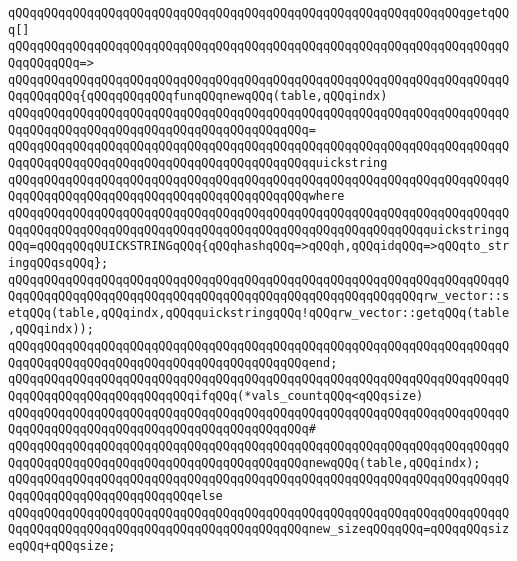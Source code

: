 \verb|qQQqqQQqqQQqqQQqqQQqqQQqqQQqqQQqqQQqqQQqqQQqqQQqqQQqqQQqqQQqqQQqgetqQQq[]|\newline
\verb|qQQqqQQqqQQqqQQqqQQqqQQqqQQqqQQqqQQqqQQqqQQqqQQqqQQqqQQqqQQqqQQqqQQqqQQqqQQqqQQq=>|\newline
\verb|qQQqqQQqqQQqqQQqqQQqqQQqqQQqqQQqqQQqqQQqqQQqqQQqqQQqqQQqqQQqqQQqqQQqqQQqqQQqqQQq{qQQqqQQqqQQqfunqQQqnewqQQq(table,qQQqindx)|\newline
\verb|qQQqqQQqqQQqqQQqqQQqqQQqqQQqqQQqqQQqqQQqqQQqqQQqqQQqqQQqqQQqqQQqqQQqqQQqqQQqqQQqqQQqqQQqqQQqqQQqqQQqqQQqqQQqqQQq=|\newline
\verb|qQQqqQQqqQQqqQQqqQQqqQQqqQQqqQQqqQQqqQQqqQQqqQQqqQQqqQQqqQQqqQQqqQQqqQQqqQQqqQQqqQQqqQQqqQQqqQQqqQQqqQQqqQQqqQQqquickstring|\newline
\verb|qQQqqQQqqQQqqQQqqQQqqQQqqQQqqQQqqQQqqQQqqQQqqQQqqQQqqQQqqQQqqQQqqQQqqQQqqQQqqQQqqQQqqQQqqQQqqQQqqQQqqQQqqQQqqQQqwhere|\newline
\verb|qQQqqQQqqQQqqQQqqQQqqQQqqQQqqQQqqQQqqQQqqQQqqQQqqQQqqQQqqQQqqQQqqQQqqQQqqQQqqQQqqQQqqQQqqQQqqQQqqQQqqQQqqQQqqQQqqQQqqQQqqQQqqQQqquickstringqQQq=qQQqqQQqQUICKSTRINGqQQq{qQQqhashqQQq=>qQQqh,qQQqidqQQq=>qQQqto_stringqQQqsqQQq};|\newline
\newline
\verb|qQQqqQQqqQQqqQQqqQQqqQQqqQQqqQQqqQQqqQQqqQQqqQQqqQQqqQQqqQQqqQQqqQQqqQQqqQQqqQQqqQQqqQQqqQQqqQQqqQQqqQQqqQQqqQQqqQQqqQQqqQQqqQQqrw_vector::setqQQq(table,qQQqindx,qQQqquickstringqQQq!qQQqrw_vector::getqQQq(table,qQQqindx));|\newline
\verb|qQQqqQQqqQQqqQQqqQQqqQQqqQQqqQQqqQQqqQQqqQQqqQQqqQQqqQQqqQQqqQQqqQQqqQQqqQQqqQQqqQQqqQQqqQQqqQQqqQQqqQQqqQQqqQQqend;|\newline
\newline
\verb|qQQqqQQqqQQqqQQqqQQqqQQqqQQqqQQqqQQqqQQqqQQqqQQqqQQqqQQqqQQqqQQqqQQqqQQqqQQqqQQqqQQqqQQqqQQqqQQqifqQQq(*vals_countqQQq<qQQqsize)|\newline
\verb|qQQqqQQqqQQqqQQqqQQqqQQqqQQqqQQqqQQqqQQqqQQqqQQqqQQqqQQqqQQqqQQqqQQqqQQqqQQqqQQqqQQqqQQqqQQqqQQqqQQqqQQqqQQqqQQq#|\newline
\verb|qQQqqQQqqQQqqQQqqQQqqQQqqQQqqQQqqQQqqQQqqQQqqQQqqQQqqQQqqQQqqQQqqQQqqQQqqQQqqQQqqQQqqQQqqQQqqQQqqQQqqQQqqQQqqQQqnewqQQq(table,qQQqindx);|\newline
\verb|qQQqqQQqqQQqqQQqqQQqqQQqqQQqqQQqqQQqqQQqqQQqqQQqqQQqqQQqqQQqqQQqqQQqqQQqqQQqqQQqqQQqqQQqqQQqqQQqelse|\newline
\verb|qQQqqQQqqQQqqQQqqQQqqQQqqQQqqQQqqQQqqQQqqQQqqQQqqQQqqQQqqQQqqQQqqQQqqQQqqQQqqQQqqQQqqQQqqQQqqQQqqQQqqQQqqQQqqQQqnew_sizeqQQqqQQq=qQQqqQQqsizeqQQq+qQQqsize;|\newline
